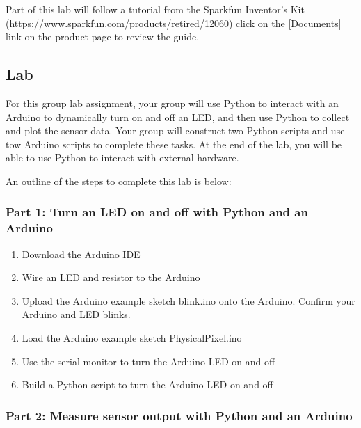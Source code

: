 \documentclass[11pt]{article}
\begin{document}
Part of this lab will follow a tutorial from the Sparkfun Inventor's Kit
(https://www.sparkfun.com/products/retired/12060) click on the
{[}Documents{]} link on the product page to review the guide.

    \hypertarget{lab}{%
\subsection{Lab}\label{lab}}

For this group lab assignment, your group will use Python to interact
with an Arduino to dynamically turn on and off an LED, and then use
Python to collect and plot the sensor data. Your group will construct
two Python scripts and use tow Arduino scripts to complete these tasks.
At the end of the lab, you will be able to use Python to interact with
external hardware.

    An outline of the steps to complete this lab is below:

\hypertarget{part-1-turn-an-led-on-and-off-with-python-and-an-arduino}{%
\subsubsection{Part 1: Turn an LED on and off with Python and an
Arduino}\label{part-1-turn-an-led-on-and-off-with-python-and-an-arduino}}

\begin{enumerate}
\def\labelenumi{(\alph{enumi})}
\item
  Download the Arduino IDE
\item
  Wire an LED and resistor to the Arduino
\item
  Upload the Arduino example sketch blink.ino onto the Arduino. Confirm
  your Arduino and LED blinks.
\item
  Load the Arduino example sketch PhysicalPixel.ino
\item
  Use the serial monitor to turn the Arduino LED on and off
\item
  Build a Python script to turn the Arduino LED on and off
\end{enumerate}

    \hypertarget{part-2-measure-sensor-output-with-python-and-an-arduino}{%
\subsubsection{Part 2: Measure sensor output with Python and an
Arduino}\label{part-2-measure-sensor-output-with-python-and-an-arduino}}
\end{document}
